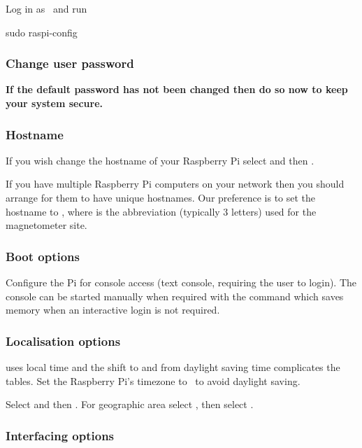 Log in as \piUser\ and run
\begin{Cmd}
sudo raspi-config
\end{Cmd}

\subsubsection{Change user password}
\textbf{If the default password has not been changed then do so now to keep
your system secure.}

\subsubsection{Hostname} 
If you wish change the hostname of your Raspberry Pi select
 and then .

If you have multiple Raspberry Pi computers on your network then you
should arrange for them to have unique hostnames. Our preference is to
set the hostname to , where  is the
abbreviation (typically 3 letters) used for the magnetometer site.

\subsubsection{Boot options} 
Configure the Pi for console access (text console, requiring the user
to login). The console can be started manually when required with the
 command which saves memory when an interactive login
is not required.

\subsubsection{Localisation options}
 uses local time and the shift to and from daylight
saving time complicates the  tables. Set the Raspberry
Pi's timezone to \utc\ to avoid daylight saving.

Select  and
then . For geographic area select %
, then select \code{\utc}.

\subsubsection{Interfacing options}

